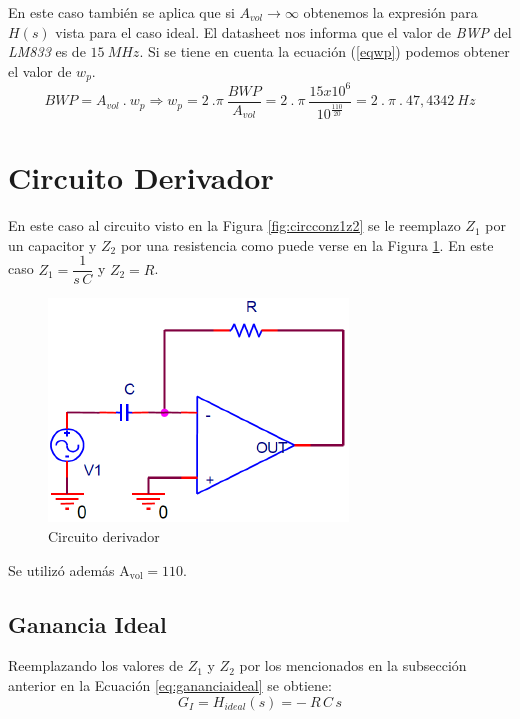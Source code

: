 \documentclass[11pt, a4paper]{article}
\begin{document}
En este caso también se aplica que si $A_{vol} \longrightarrow \infty$ obtenemos la expresión para $H(s)$ vista para el caso ideal.
El datasheet nos informa que el valor de \textit{BWP} del \textit{LM833} es de $15 \ MHz$.
Si se tiene en cuenta la ecuación (\ref{eqwp}) podemos obtener el valor de $w_p$.
\begin{equation}\label{eqwp}
BWP = A_{vol} \ . \ w_p \Rightarrow w_p= 2 \ . \pi \ \frac{BWP}{A_{vol}}= 2 \ . \ \pi \ \frac{15x10^6}{10^{\frac{110}{20}}} = 2 \ . \ \pi \ . \ 47,4342 \ Hz
\end{equation}















\section{Circuito Derivador}
En este caso al circuito visto en la Figura \ref{fig:circconz1z2} se le reemplazo $Z_1$ por un capacitor y $Z_2$ por una resistencia como puede verse en la Figura \ref{fig:circuitoderivador}. En este caso $Z_1=\dfrac{1}{s \, C}$ y $Z_2= R$.
\begin{figure}[H]
\centering
\includegraphics[scale=0.5]{circuitoderivador.png}
\caption{Circuito derivador}
\label{fig:circuitoderivador}
\end{figure}

Se utilizó además $\mathrm{A_{vol}}=110$.

\subsection{Ganancia Ideal}
Reemplazando los valores de $Z_1$ y $Z_2$ por los mencionados en la subsección anterior en la Ecuación \ref{eq:gananciaideal} se obtiene:
\begin{equation}
G_I=H_{ideal}(s)= - \ R \,C \,s
\end{equation}
\end{document}
